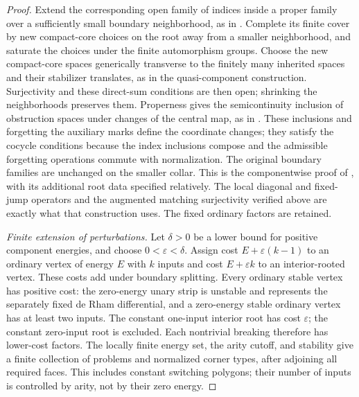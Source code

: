 \documentclass[11pt]{article}
\numberwithin{equation}{section}
\theoremstyle{definition}
\theoremstyle{remark}
\begin{document}
\begin{proof}
Extend the corresponding open family of indices inside a proper
family over a sufficiently small boundary neighborhood, as in
\cite[Proposition~8.18]{FOOOChartsII}.  Complete its finite cover
by new compact-core choices on the root away from a smaller
neighborhood, and saturate the choices under the finite
automorphism groups.  Choose the new compact-core spaces generically
transverse to the finitely many inherited spaces and their
stabilizer translates, as in the quasi-component construction.
Surjectivity and these direct-sum conditions are then open;
shrinking the neighborhoods preserves them.
Properness gives the semicontinuity inclusion of obstruction
spaces under changes of the central map, as in
\cite[Proposition~8.17]{FOOOChartsII}.  These inclusions and
forgetting the auxiliary marks define the coordinate changes;
they satisfy the cocycle conditions because the index inclusions
compose and the admissible forgetting operations commute with
normalization.  The original boundary families are unchanged on
the smaller collar.  This is the componentwise proof of
\cite[Theorems~5.3 and~5.4]{FOOOChartsII}, with its additional root
data specified relatively.  The local diagonal and fixed-jump
operators and the augmented matching surjectivity verified above
are exactly what that construction uses.  The fixed ordinary
factors are retained.

\emph{Finite extension of perturbations.}
Let $\delta>0$ be a lower bound for positive component energies,
and choose $0<\varepsilon<\delta$.  Assign cost
$E+\varepsilon(k-1)$ to an ordinary vertex of energy $E$ with $k$
inputs and cost $E+\varepsilon k$ to an interior-rooted vertex.
These costs add under boundary splitting.  Every ordinary stable
vertex has positive cost: the zero-energy unary strip is unstable
and represents the separately fixed de Rham differential, and a
zero-energy stable ordinary vertex has at least two inputs.  The
constant one-input interior root has cost $\varepsilon$; the
constant zero-input root is excluded.  Each nontrivial breaking
therefore has lower-cost factors.  The locally finite energy set,
the arity cutoff, and stability give a finite collection of
problems and normalized corner types, after adjoining all required
faces.  This includes constant switching polygons; their number of
inputs is controlled by arity, not by their zero energy.


\end{proof}
\end{document}
